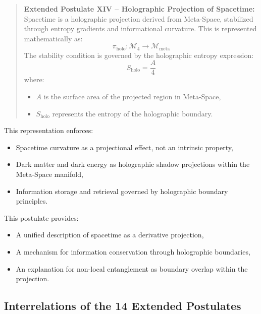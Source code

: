 \documentclass[10.5pt,a4paper]{article}
\begin{document}
\begin{quote}
\textbf{Extended Postulate XIV – Holographic Projection of Spacetime:}  
Spacetime is a holographic projection derived from Meta-Space, stabilized through entropy gradients 
and informational curvature. This is represented mathematically as:
\[
\pi_{\text{holo}}: \mathcal{M}_4 \rightarrow \mathcal{M}_{\text{meta}}
\]
The stability condition is governed by the holographic entropy expression:
\[
S_{\text{holo}} = \frac{A}{4}
\]
where:
\begin{itemize}
    \item $A$ is the surface area of the projected region in Meta-Space,
    \item $S_{\text{holo}}$ represents the entropy of the holographic boundary.
\end{itemize}
\end{quote}

This representation enforces:
\begin{itemize}
    \item Spacetime curvature as a projectional effect, not an intrinsic property,
    \item Dark matter and dark energy as holographic shadow projections within the Meta-Space manifold,
    \item Information storage and retrieval governed by holographic boundary principles.
\end{itemize}

This postulate provides:
\begin{itemize}
    \item A unified description of spacetime as a derivative projection,
    \item A mechanism for information conservation through holographic boundaries,
    \item An explanation for non-local entanglement as boundary overlap within the projection.
\end{itemize}

\subsection{Interrelations of the 14 Extended Postulates}
\end{document}
